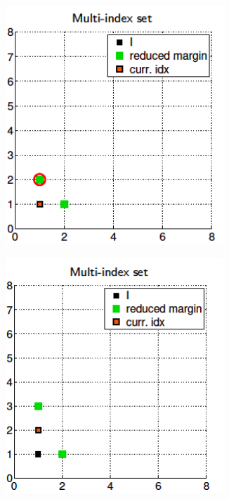 \documentclass[ima, 20pt, portrait, plainboxedsections]{sciposter}
\begin{document}
\begin{multicols}{3}
\begin{itemize}
\begin{figure}
\begin{subfigure}{0.32\textwidth}
		\caption{}
	\end{subfigure}\hfil
	\begin{subfigure}{0.32\textwidth}
		\centering
		\includegraphics[width=0.9\textwidth]{./MISC_construction/3}
		\caption{}
	\end{subfigure}\hfil
	\medskip
\begin{subfigure}{0.32\textwidth}
	\centering
	\includegraphics[width=0.9\textwidth]{./MISC_construction/4}

\end{subfigure}
\end{figure}
\end{itemize}
\end{multicols}
\end{document}
